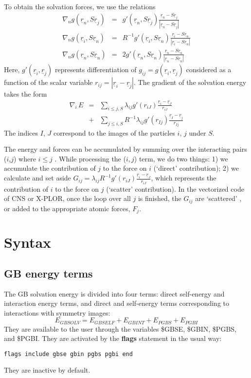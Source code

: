 \documentclass[12pt]{report}
\newcommand{\und}{\underline}
\begin{document}
To obtain the solvation forces, we use the relations
\begin{eqnarray}
\nabla_n g(\und{r}_n,S\und{r}_j) &=& 
     g'(\und{r}_n,S\und{r}_j) \frac{\und{r}_n - S \und{r}_j}{| \und{r}_n - S \und{r}_j |} 
\nonumber \\
\nabla_n g(\und{r}_i,S\und{r}_n) &=& 
     R^{-1} g'(\und{r}_i,S\und{r}_n) \frac{\und{r}_i - S \und{r}_n}{| \und{r}_i - S \und{r}_n |} 
\label{eq:jimage} \nonumber \\
\nabla_n g(\und{r}_n,S\und{r}_n) &=& 
     2 g'(\und{r}_n,S\und{r}_n) \frac{\und{r}_n - S \und{r}_n}{| \und{r}_n - S \und{r}_n |}
\nonumber
\label{eq:iimage}
\end{eqnarray}
Here, $g'(\und{r}_i,\und{r}_j)$ represents differentiation of $g_{ij}=g(\und{r}_i,\und{r}_j)$ considered as a
function of the scalar variable $r_{ij} = |\und{r}_i - \und{r}_j|$. The gradient of the solvation energy takes
the form
\begin{eqnarray}
\nabla_i \, E &=& \sum_{i \leq j, S} \lambda_{ij} g'(r_{iJ}) \frac{\und{r}_i - \und{r}_J}{r_{iJ}}
\nonumber \\
 &+& \sum_{j \leq i, S} R^{-1} \lambda_{ij} g'(r_{Ij}) \frac{\und{r}_I - \und{r}_j}{r_{Ij}} 
\end{eqnarray}
The indices $I$, $J$ correspond to the images of the particles $i$, $j$ under $S$.

The energy and forces can be accumulated by summing over the interacting pairs ($i$,$j$) where $i \leq j$
\cite{Verlet67}. While processing the ($i,j$) term, we do two things: 1) we accumulate the contribution of $j$ to
the force on $i$ (`direct' contribution); 2) we calculate and set aside $G_{ij} = \lambda_{ij} R^{-1} g'(r_{iJ})
\frac{\und{r}_i - \und{r}_J}{r_{iJ}}$, which represents the contribution of $i$ to the force on $j$ (`scatter'
contribution). In the vectorized code of CNS or X-PLOR, once the loop over all $j$ is finished, the $G_{ij}$
are `scattered' \cite{AllenBK}, or added to the appropriate atomic forces, $F_j$.

\section{Syntax}
\subsection{GB energy terms}
The GB solvation energy is divided into four terms: direct self-energy and interaction energy terms, and
direct and self-energy terms corresponding to interactions with symmetry images:
\[ E_{GBSOLV} = E_{GBSELF} + E_{GBINT} + E_{PGBS} + E_{PGBI} \]
They are available to the user through the variables \$GBSE, \$GBIN, \$PGBS, and \$PGBI. They are activated
by the {\bf flags} statement in the usual way:
\begin{verbatim}
flags include gbse gbin pgbs pgbi end
\end{verbatim}
They are inactive by default.
\end{document}
